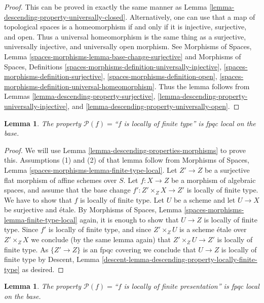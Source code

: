 \documentclass{stacks-project}
\theoremstyle{plain}
\newtheorem{lemma}[subsection]{Lemma}
\theoremstyle{definition}
\theoremstyle{remark}
\numberwithin{equation}{subsection}
\begin{document}
\begin{proof}
This can be proved in exactly the same manner as
Lemma \ref{lemma-descending-property-universally-closed}.
Alternatively, one can use that a map of topological spaces is a
homeomorphism if and only if it is injective, surjective, and open.
Thus a universal homeomorphism is the same thing as a
surjective, universally injective, and universally open morphism.
See Morphisms of Spaces, Lemma
\ref{spaces-morphisms-lemma-base-change-surjective} and
Morphisms of Spaces, Definitions
\ref{spaces-morphisms-definition-universally-injective},
\ref{spaces-morphisms-definition-surjective},
\ref{spaces-morphisms-definition-open},
\ref{spaces-morphisms-definition-universal-homeomorphism}.
Thus the lemma follows from
Lemmas \ref{lemma-descending-property-surjective},
\ref{lemma-descending-property-universally-injective}, and
\ref{lemma-descending-property-universally-open}.
\end{proof}

\begin{lemma}
\label{lemma-descending-property-locally-finite-type}
The property $\mathcal{P}(f) =$``$f$ is locally of finite type''
is fpqc local on the base.
\end{lemma}

\begin{proof}
We will use
Lemma \ref{lemma-descending-properties-morphisms}
to prove this. Assumptions (1) and (2) of that lemma follow from
Morphisms of Spaces,
Lemma \ref{spaces-morphisms-lemma-finite-type-local}.
Let $Z' \to Z$ be a surjective flat morphism of affine schemes over $S$.
Let $f : X \to Z$ be a morphism of algebraic spaces, and assume
that the base change $f' : Z' \times_Z X \to Z'$ is locally of finite type.
We have to show that $f$ is locally of finite type. Let $U$ be a scheme
and let $U \to X$ be surjective and \'etale. By
Morphisms of Spaces,
Lemma \ref{spaces-morphisms-lemma-finite-type-local}
again, it is enough to show that $U \to Z$ is locally of finite type.
Since $f'$ is locally of finite type, and since $Z' \times_Z U$ is a
scheme \'etale over $Z' \times_Z X$ we conclude (by the same lemma again) that
$Z' \times_Z U \to Z'$ is locally of finite type.
As $\{Z' \to Z\}$ is an fpqc covering we conclude that
$U \to Z$ is locally of finite type by
Descent, Lemma \ref{descent-lemma-descending-property-locally-finite-type}
as desired.
\end{proof}

\begin{lemma}
\label{lemma-descending-property-locally-finite-presentation}
The property $\mathcal{P}(f) =$``$f$ is locally of finite presentation''
is fpqc local on the base.
\end{lemma}
\end{document}
